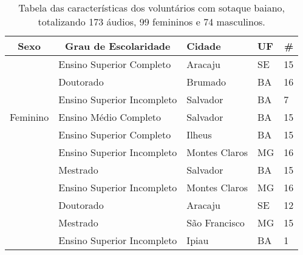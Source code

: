 \begin{table}[h]
\caption{Tabela das características dos voluntários com sotaque baiano, totalizando 173 áudios, 99 femininos e 74 masculinos.} \label{Tabela_baiano}
\begin{tabular}{|l|l|l|l|l|}
\hline
\multicolumn{1}{|c|}{Sexo}  & \multicolumn{1}{c|}{Grau de Escolaridade} & Cidade           & UF & \multicolumn{1}{r|}{\#}    \\ \hline
\multirow{7}{*}{Feminino}
                            &             Ensino Superior Completo                  & Aracaju          & SE & 15 \\ \cline{2-5} 
                            &           Doutorado                                 & Brumado          & BA & 16                         \\ \cline{2-5} 
                            &              Ensino Superior Incompleto                & Salvador         & BA & 7                          \\ \cline{2-5} 
                            &                   Ensino Médio Completo                     & Salvador         & BA & 15                         \\ \cline{2-5} 
                            &                  Ensino Superior Completo                  & Ilheus           & BA & 15                         \\ \cline{2-5} 
                            &     Ensino Superior Incompleto                & Montes Claros    & MG & 16                         \\ \cline{2-5} 
\multirow{8}{*}{Masculino}    & Mestrado                                  & Salvador         & BA & 15                         \\ \hline
                                           & Ensino Superior Incompleto                & Montes Claros    & MG & 16                         \\ \cline{2-5} 
                             & Doutorado                                 & Aracaju          & SE & 12                         \\ \cline{2-5} 
                    & Mestrado                                  & São Francisco    & MG & 15                         \\ \cline{2-5} 
                           & Ensino Superior Incompleto                & Ipiau            & BA & 1                          \\ \cline{2-5} 

\end{tabular}
\end{table}
